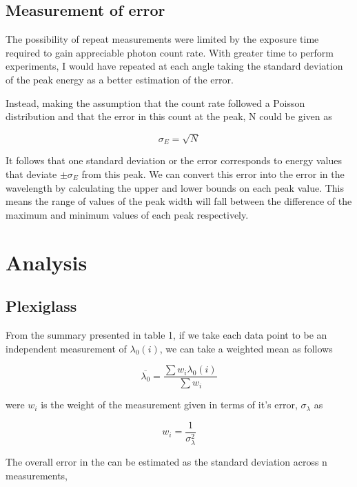 \documentclass{article}%
\begin{document}
\subsection{Measurement of error}
The possibility of repeat measurements were limited by the exposure time required to gain appreciable photon count rate. With greater time to perform experiments, I would have repeated at each angle taking the standard deviation of the peak energy as a better estimation of the error.

Instead, making the assumption that the count rate followed a Poisson distribution and that the error in this count at the peak, N could be given as
   
\begin{equation}
    \sigma_{E} = \sqrt{N}
\end{equation}

It follows that one standard deviation or the error corresponds to energy values that deviate $\pm \sigma_{E}$ from this peak. We can convert this error into the error in the wavelength by calculating the upper and lower bounds on each peak value.
This means the range of values of the peak width will fall between the difference of the maximum and minimum values of each peak respectively. 


\section{Analysis}

\subsection{Plexiglass}

From the summary presented in table 1, if we take each data point to be an independent measurement of $\lambda_0(i)$, we can take a weighted mean as follows

\begin{equation}
    \overline{\lambda_0} = \frac{\sum{w_i\lambda_0(i)}}{\sum{w_i}}
\end{equation}

were $w_i$ is the weight of the measurement given in terms of it's error, $\sigma_{\lambda}$ as 

\begin{equation}
    w_i = \frac{1}{\sigma_{\lambda}^2}
\end{equation}

The overall error in the can be estimated as the standard deviation across n measurements,
\end{document}
